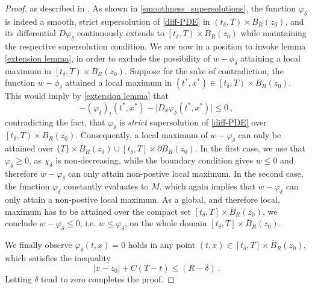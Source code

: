 \begin{theorem}
\begin{proof}
				as described in \cite[p.~73]{barles}. As shown in \ref{smoothness_supersolutions}, the function $ \varphi_{\delta} $ is indeed a smooth, strict supersolution of \eqref{diff-PDE} in $ \left(t_{\delta}, T \right) \times B_R(z_0) $, and its differential $ D \varphi_{\delta} $ continuously extends to $ \left[t_{\delta}, T \right) \times B_R(z_0) $ while maintaining the respective supersolution condition. We are now in a position to invoke lemma \ref{extension lemma}, in order to exclude the possibility of $ w - \phi_{\delta} $ attaining a local maximum in $ \left[t_{\delta}, T \right) \times B_R (z_0) $. Suppose for the sake of contradiction, the function $ w - \phi_{\delta} $ attained a local maximum in $ (t^{*}, x^{*}) \in \left[t_{\delta}, T \right) \times B_R (z_0) $. This would imply by \ref{extension lemma} that
				\begin{equation*}
					-(\varphi_{\delta})_t(t^*, x^*) - \lvert D_x \varphi_{\delta}(t^*, x^*) \rvert \leq 0 \ ,
				\end{equation*}
				contradicting the fact, that $ \varphi_{\delta} $ is \emph{strict} supersolution of \eqref{diff-PDE} over $ \left[t_{\delta}, T \right) \times B_R (z_0) $.
				Consequently, a local maximum of $ w - \varphi_{\delta} $ can only be attained over $ \{T\} \times \overline{B}_R (z_0) \cup \left[t_{\delta}, T\right] \times \partial B_R(z_0) $. In the first case, we use that $ \varphi_{\delta} \geq 0 $, as $ \chi_{\delta} $ is non-decreasing, while the boundary condition gives $ w \leq 0 $ and therefore $ w - \varphi_{\delta} $ can only attain non-postive local maximum. In the second case, the function $ \varphi_{\delta} $ constantly evaluates to $ M $, which again implies that $ w - \varphi_{\delta} $ can only attain a non-postive local maximum. As a global, and therefore local, maximum has to be attained over the compact set $ \left[t_{\delta}, T\right] \times \overline{B}_R (z_0)$, we conclude $ w - \varphi_{\delta} \leq 0$, i.e. $ w \leq \varphi_{\delta} $, on the whole domain $ \left[t_{\delta}, T\right] \times \overline{B}_R (z_0) $.
				
				We finally observe $ \varphi_{\delta}(t, x) = 0 $ holds in any point $ (t, x) \in \left[t_{\delta}, T\right] \times \overline{B}_R(z_0)$, which satisfies the inequality
				\begin{equation*}
					\lvert x - z_0 \rvert + C(T - t) \leq (R - \delta) \ .
				\end{equation*}
				Letting $ \delta $ tend to zero completes the proof.
			\end{proof}
		\end{theorem}